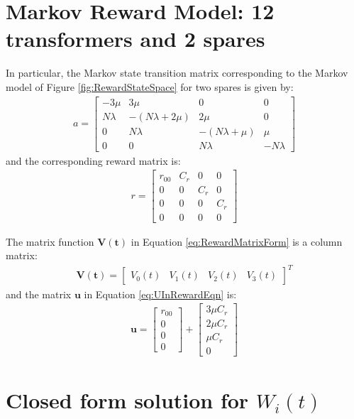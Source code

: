 \section{Markov Reward Model: 12 transformers and 2 spares}
In particular, the Markov state transition matrix corresponding to the Markov model of Figure \ref{fig:RewardStateSpace} for two spares is given by:
\begin{align}
a=
\begin{bmatrix}
-3\mu	 & 	3\mu	 & 	0	 & 	 0	\\
N\lambda	 & 	-( N\lambda + 2\mu)	 & 	2\mu	 & 	0	\\
0	 & 	N\lambda	 & 	-( N\lambda + \mu)	 & 	\mu	\\
0	 & 	0	 & 	N\lambda	 & 	-N\lambda 
\end{bmatrix}
\end{align}
and the corresponding reward matrix is:
\begin{align}
r=
\begin{bmatrix}
r_{00}	&		C_r		&		0		&		0		\\
0				&		0			&		C_r	&		0		\\
0				&		0			&		0		&		C_r	\\
0				&		0			&		0		&		0
\end{bmatrix}
\end{align}

The matrix function $\pmb{V(t)}$ in Equation \ref{eq:RewardMatrixForm} is a column matrix:
\begin{align}
\pmb{V(t)}=
\begin{bmatrix}
V_0(t)	&	V_1(t)	&	V_2(t)	&	V_3(t)
\end{bmatrix}^T
\end{align}
and the matrix $\pmb{u}$ in Equation  \ref{eq:UInRewardEqn} is:
\begin{align}
\mathbf{u}=
\begin{bmatrix}
r_{00} \\
0 \\
0 \\
0
\end{bmatrix} + 
\begin{bmatrix}
3\mu C_r \\
2\mu C_r \\
\mu C_r \\
0
\end{bmatrix}
\end{align}


\section{Closed form solution for $W_i(t)$}

